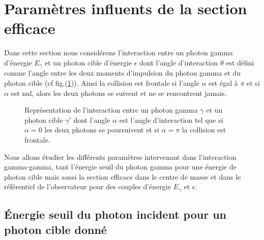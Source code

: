 \documentclass[a4paper,12pt,twoside]{article}
\begin{document}
\section{Paramètres influents de la section efficace}

Dans cette section nous considérons l'interaction entre un photon gamma d'énergie $E_\gamma$ et un photon cible d'énergie $\epsilon$ dont l'angle d'interaction $\theta$ est défini comme l'angle entre les deux moments d'impulsion du photon gamma et du photon cible (cf fig.(\ref{fig: alpha})). Ainsi la collision est frontale si l'angle $\alpha$ est égal à $\pi$ et si $\alpha$ est nul, alors les deux photons se suivent et ne se rencontrent jamais.


\begin{figure}[H]
	\centering
    \caption{Représentation de l'interaction entre un photon gamma $\gamma$ et un photon cible $\gamma\prime$ dont l'angle $\alpha$ est l'angle d'interaction tel que si $\alpha = 0$ les deux photons se poursuivent et si $\alpha = \pi$ la collision est frontale.}
    \label{fig: alpha}
\end{figure}

Nous allons étudier les différents paramètres intervenant dans l'interaction gamma-gamma, tant l'énergie seuil du photon gamma pour une énergie de photon cible mais aussi la section efficace dans le centre de masse et dans le référentiel de l'observateur pour des couples d'énergie $E_\gamma$ et $\epsilon$.

\subsection{Énergie seuil du photon incident pour un photon cible donné}\label{sec: Eth}
\end{document}

